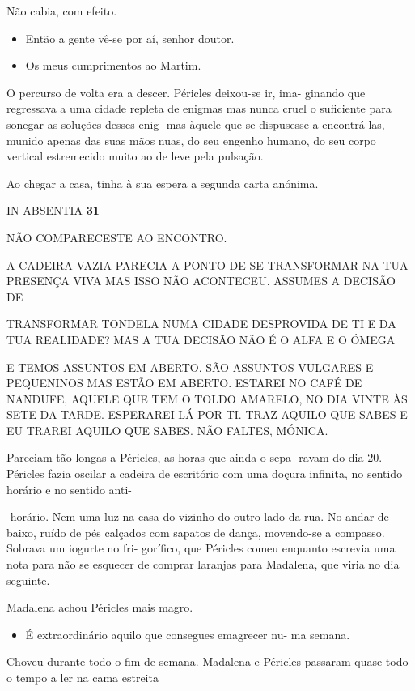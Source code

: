 Não cabia, com efeito.

\begin{itemize}
\tightlist
\item
  Então a gente vê-se por aí, senhor doutor.
\item
  Os meus cumprimentos ao Martim.
\end{itemize}

O percurso de volta era a descer. Péricles deixou-se ir, ima- ginando
que regressava a uma cidade repleta de enigmas mas nunca cruel o
suficiente para sonegar as soluções desses enig- mas àquele que se
dispusesse a encontrá-las, munido apenas das suas mãos nuas, do seu
engenho humano, do seu corpo vertical estremecido muito ao de leve pela
pulsação.

Ao chegar a casa, tinha à sua espera a segunda carta anónima.

IN ABSENTIA \textbf{31}

NÃO COMPARECESTE AO ENCONTRO.

A CADEIRA VAZIA PARECIA A PONTO DE SE TRANSFORMAR NA TUA PRESENÇA VIVA
MAS ISSO NÃO ACONTECEU. ASSUMES A DECISÃO DE

TRANSFORMAR TONDELA NUMA CIDADE DESPROVIDA DE TI E DA TUA REALIDADE? MAS
A TUA DECISÃO NÃO É O ALFA E O ÓMEGA

E TEMOS ASSUNTOS EM ABERTO. SÃO ASSUNTOS VULGARES E PEQUENINOS MAS ESTÃO
EM ABERTO. ESTAREI NO CAFÉ DE NANDUFE, AQUELE QUE TEM O TOLDO AMARELO,
NO DIA VINTE ÀS SETE DA TARDE. ESPERAREI LÁ POR TI. TRAZ AQUILO QUE
SABES E EU TRAREI AQUILO QUE SABES. NÃO FALTES, MÓNICA.

Pareciam tão longas a Péricles, as horas que ainda o sepa- ravam do dia
20. Péricles fazia oscilar a cadeira de escritório com uma doçura
infinita, no sentido horário e no sentido anti-

-horário. Nem uma luz na casa do vizinho do outro lado da rua. No andar
de baixo, ruído de pés calçados com sapatos de dança, movendo-se a
compasso. Sobrava um iogurte no fri- gorífico, que Péricles comeu
enquanto escrevia uma nota para não se esquecer de comprar laranjas para
Madalena, que viria no dia seguinte.

Madalena achou Péricles mais magro.

\begin{itemize}
\tightlist
\item
  É extraordinário aquilo que consegues emagrecer nu- ma semana.
\end{itemize}

Choveu durante todo o fim-de-semana. Madalena e Péricles passaram quase
todo o tempo a ler na cama estreita

